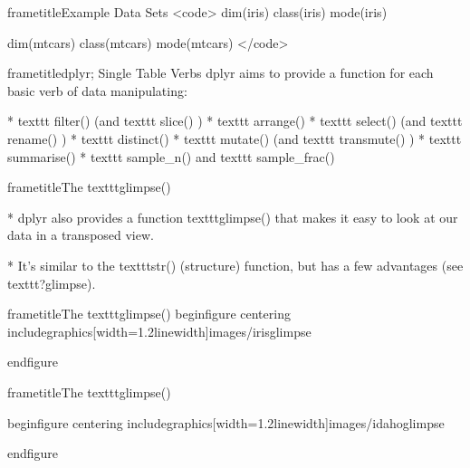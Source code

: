 	
		frametitle{Example Data Sets}
		<code>
		dim(iris)
		class(iris)
		mode(iris)
		
		dim(mtcars)
		class(mtcars)
		mode(mtcars)
		</code>
	
	
		frametitle{dplyr; Single Table Verbs}
		dplyr aims to provide a function for each basic verb of data manipulating:
		
			         * texttt{ filter() } (and texttt{  slice() })
			         * texttt{ arrange() }
			         * texttt{ select() } (and texttt{  rename() })
			         * texttt{ distinct() }
			         * texttt{ mutate() } (and texttt{  transmute() })
			         * texttt{ summarise() }
			         * texttt{ sample_n() } and texttt{  sample_frac() }
		
	
	
	
		
		frametitle{The texttt{glimpse()}} 
			
				         * dplyr also provides a function texttt{glimpse()} that makes it easy to look at our data in a transposed view. 
				
				         * It's similar to the texttt{str()} (structure) function, but has a few advantages (see texttt{?glimpse}).
				
			
		
		
			
			frametitle{The texttt{glimpse()} }
				begin{figure}
					centering
					includegraphics[width=1.2linewidth]{images/irisglimpse}
				
				end{figure}
				
			
			
				frametitle{The texttt{glimpse()} }
					
begin{figure}
centering
includegraphics[width=1.2linewidth]{images/idahoglimpse}

end{figure}
					
